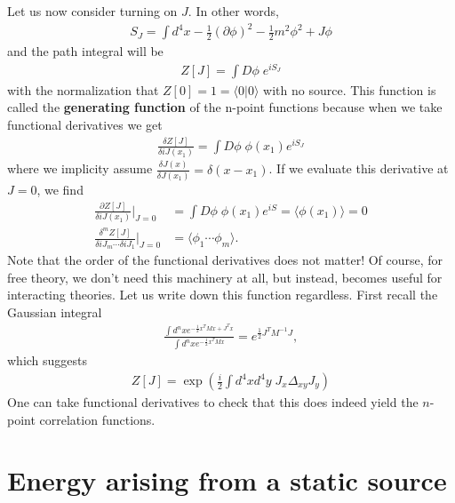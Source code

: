 \documentclass{../mathnotes}
\begin{document}
Let us now consider turning on $J$. In other words,
\begin{align*}
    S_J=\int d^4x -\frac{1}{2}(\partial\phi)^2-\frac{1}{2}m^2\phi^2+J\phi
\end{align*}
and the path integral will be
\begin{align*}
    Z[J]=\int D\phi\;e^{iS_J}
\end{align*}
with the normalization that $Z[0]=1=\langle 0|0\rangle$ with no source. This function is called the \textbf{generating function} of the n-point functions because
when we take functional derivatives we get
\begin{align*}
    \frac{\delta Z[J]}{\delta iJ(x_1)}=\int D\phi\;\phi(x_1)e^{iS_J}
\end{align*}
where we implicity assume $\frac{\delta J(x)}{\delta J(x_1)}=\delta(x-x_1)$. If we evaluate this derivative at $J=0$, we find
\begin{align*}
    \frac{\partial Z[J]}{\delta iJ(x_1)}|_{J=0}&=\int D\phi\;\phi(x_1)e^{iS}=\langle\phi(x_1)\rangle=0\\
    \frac{\delta^mZ[J]}{\delta iJ_m \cdots \delta iJ_1}|_{J=0}&=\langle \phi_1 \cdots \phi_m \rangle.
\end{align*}
Note that the order of the functional derivatives does not matter! Of course, for free theory, we don't need this machinery at all,
but instead, becomes useful for interacting theories. Let us write down this function regardless. First recall the Gaussian integral
\begin{align*}
    \frac{\int d^nx e^{-\frac{1}{2}x^TMx+J^Tx}}{\int d^nx e^{-\frac{1}{2}x^TMx}}=e^{\frac{1}{2}J^TM^{-1}J},
\end{align*}
which suggests
\begin{align*}
    Z[J]=\exp\left( \frac{i}{2}\int d^4x d^4y\;J_x \Delta_{xy}J_y\right)
\end{align*}
One can take functional derivatives to check that this does indeed yield the $n$-point correlation functions.

\section{Energy arising from a static source}
\end{document}
